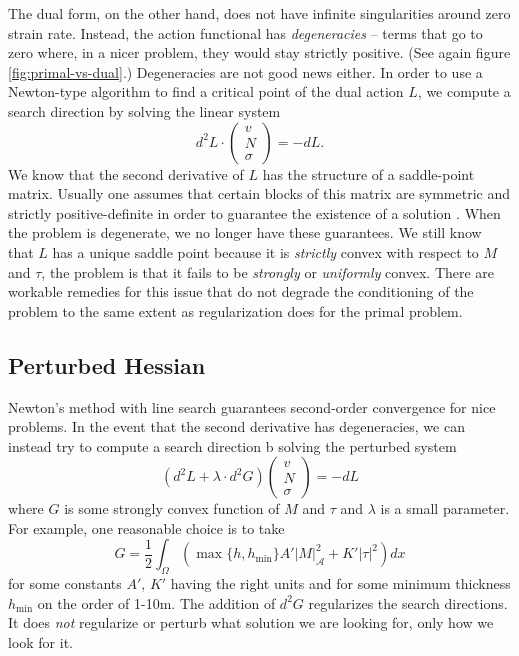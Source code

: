 \documentclass[twocolumn,letterpaper]{igs}
\begin{document}
The dual form, on the other hand, does not have infinite singularities around zero strain rate.
Instead, the action functional has \emph{degeneracies} -- terms that go to zero where, in a nicer problem, they would stay strictly positive.
(See again figure \ref{fig:primal-vs-dual}.)
Degeneracies are not good news either.
In order to use a Newton-type algorithm to find a critical point of the dual action $L$, we compute a search direction by solving the linear system
\begin{equation}
    d^2L\cdot\left(\begin{matrix} v \\ N \\ \sigma\end{matrix}\right) = -dL.
\end{equation}
We know that the second derivative of $L$ has the structure of a saddle-point matrix.
Usually one assumes that certain blocks of this matrix are symmetric and strictly positive-definite in order to guarantee the existence of a solution \citep{boffi2013mixed}.
When the problem is degenerate, we no longer have these guarantees.
We still know that $L$ has a unique saddle point because it is \emph{strictly} convex with respect to $M$ and $\tau$, the problem is that it fails to be \emph{strongly} or \emph{uniformly} convex.
There are workable remedies for this issue that do not degrade the conditioning of the problem to the same extent as regularization does for the primal problem.

\subsection{Perturbed Hessian}

Newton's method with line search guarantees second-order convergence for nice problems.
In the event that the second derivative has degeneracies, we can instead try to compute a search direction b solving the perturbed system
\begin{equation}
    \left(d^2L + \lambda\cdot d^2G\right)\left(\begin{matrix} v \\ N \\ \sigma\end{matrix}\right) = -dL
    \label{eq:regularized-newton-step}
\end{equation}
where $G$ is some strongly convex function of $M$ and $\tau$ and $\lambda$ is a small parameter.
For example, one reasonable choice is to take
\begin{equation}
    G = \frac{1}{2}\int_\Omega\left(\max\{h, h_{\text{min}}\}A'|M|_{\mathscr{A}}^2 + K'|\tau|^2\right)dx
\end{equation}
for some constants $A'$, $K'$ having the right units and for some minimum thickness $h_{\text{min}}$ on the order of 1-10m.
The addition of $d^2G$ regularizes the search directions.
It does \emph{not} regularize or perturb what solution we are looking for, only how we look for it.
\end{document}
